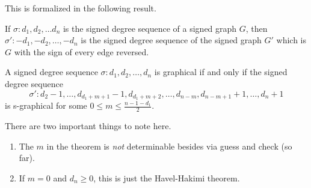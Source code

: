 \begin{frame}
    This is formalized in the following result.

    \begin{lemma}
        If $\sigma : d_1,d_2,\dots d_n$ is the signed degree sequence of a signed graph $G$, then $\sigma' : -d_1,-d_2,\dots,-d_n$ is the signed degree sequence of the signed graph $G'$ which is $G$ with the sign of every edge reversed.
    \end{lemma}
\end{frame}

\begin{frame}
    \begin{theorem}
        A signed degree sequence $\sigma : d_1,d_2,\dots,d_n$ is graphical if and only if the signed degree sequence
        \begin{equation*}
            \sigma' : d_2-1,\dots,d_{d_1+m+1}-1,d_{d_1+m+2},\dots,d_{n-m},d_{n-m+1}+1,\dots,d_n+1
        \end{equation*}
        is s-graphical for some $0 \leq m \leq \frac{n-1-d_1}{2}$.
    \end{theorem}
    There are two important things to note here.
    \begin{enumerate}
        \item The $m$ in the theorem is \textit{not} determinable besides via guess and check (so far).
        \item If $m = 0$ and $d_n \geq 0$, this is just the Havel-Hakimi theorem.
    \end{enumerate}
\end{frame}
